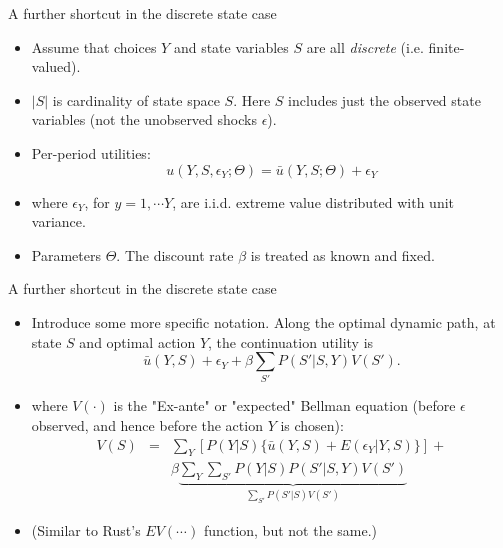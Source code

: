 \documentclass[aspectratio=169,11pt]{beamer}
\begin{document}
\begin{frame}{A further shortcut in the discrete state case}
\begin{itemize}
\item Assume that choices $Y$ and state variables $S$ are all \emph{discrete} (i.e. finite-valued).
\item  $|S|$ is cardinality of state space $S$. Here $S$ includes just the observed state variables (not  the unobserved shocks $\epsilon$). 
\item Per-period utilities:
\begin{equation*}
u(Y, S, \epsilon_Y; \Theta) = \bar u (Y, S; \Theta) + \epsilon_Y
\end{equation*}
\item where $\epsilon_Y$, for $y=1, \cdots Y$, are i.i.d. extreme value distributed with unit variance. \\
\item Parameters $\Theta$. The discount rate $\beta$ is treated as known and fixed. \\
\end{itemize}
\end{frame}

\begin{frame}{A further shortcut in the discrete state case}
\begin{itemize}
\item Introduce some more specific notation. Along the optimal dynamic path, at state $S$ and optimal action $Y$, the continuation utility is
\begin{equation*}
\bar u (Y,S) + \epsilon_Y + \beta \sum_{S'} P(S' | S, Y) V(S').
\end{equation*}
\item where $V(\cdot)$ is the "Ex-ante" or "expected" Bellman equation (before $\epsilon$ observed, and hence before the action $Y$ is chosen):
\begin{eqnarray}
\nonumber V(S) &= & \sum_Y [ P(Y|S) \{ \bar u (Y,S) + E(\epsilon_Y | Y, S) \} ] +\\ 
&& \beta \underbrace{\sum_Y \sum_{S'} P(Y|S) P(S'|S, Y) V(S')}_{\sum_{S'} P(S' | S) V(S') }  
\end{eqnarray}
\item (Similar to Rust's $EV(\cdots)$ function, but \alert{not the same}.)
\end{itemize}
\end{frame}
\end{document}
